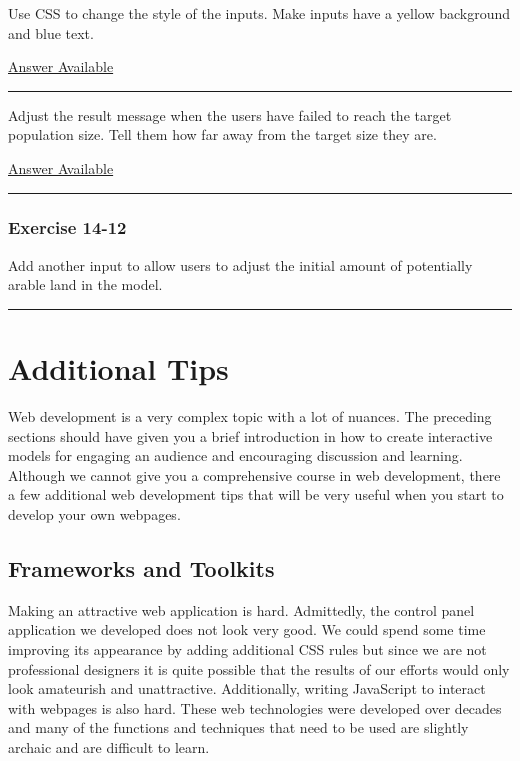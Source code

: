 \documentclass[]{memoir}
\begin{document}
Use CSS to change the style of the inputs. Make inputs have a yellow
background and blue text.

\hyperref[Ans-14-10]{Answer Available}

\begin{center}\rule{3in}{0.4pt}\end{center}


Adjust the result message when the users have failed to reach the target
population size. Tell them how far away from the target size they are.

\hyperref[Ans-14-11]{Answer Available}

\begin{center}\rule{3in}{0.4pt}\end{center}

\subsubsection{Exercise 14-12}

Add another input to allow users to adjust the initial amount of
potentially arable land in the model.

\begin{center}\rule{3in}{0.4pt}\end{center}

\section{Additional Tips}

Web development is a very complex topic with a lot of nuances. The
preceding sections should have given you a brief introduction in how to
create interactive models for engaging an audience and encouraging
discussion and learning. Although we cannot give you a comprehensive
course in web development, there a few additional web development tips
that will be very useful when you start to develop your own webpages.

\subsection{Frameworks and Toolkits}

Making an attractive web application is hard. Admittedly, the control
panel application we developed does not look very good. We could spend
some time improving its appearance by adding additional CSS rules but
since we are not professional designers it is quite possible that the
results of our efforts would only look amateurish and unattractive.
Additionally, writing JavaScript to interact with webpages is also hard.
These web technologies were developed over decades and many of the
functions and techniques that need to be used are slightly archaic and
are difficult to learn.
\end{document}
